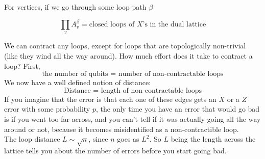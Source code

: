 For vertices, if we go through some loop path $\beta$
\begin{center}
\end{center}

\begin{equation}
    \prod_v A_v^\beta = \text{closed loops of } X\text{'s in the dual lattice}
\end{equation}

We can contract any loops, except for loops that are topologically non-trivial (like they wind all the way around). How much effort does it take to contract a loop? First, 
\begin{equation}
\text{the number of qubits = number of non-contractable loops}    
\end{equation}
We now have a well defined notion of distance:
\begin{equation}
\text{Distance = length of non-contractable loops}  
\end{equation}
If you imagine that the error is that each one of these edges gets an $X$ or a $Z$ error with some probability $p$, the only time you have an error that would go bad is if you went too far across, and you can't tell if it was actually going all the way around or not, because it becomes misidentified as a non-contractible loop. \\
The loop distance $L\sim \sqrt{n}$, since $n$ goes as $L^2$. So $L$ being the length across the lattice tells you about the number of errors before you start going bad. \\

